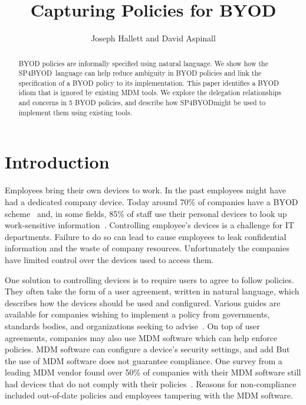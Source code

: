 \documentclass{llncs}
\title{Capturing Policies for BYOD}
\author{Joseph Hallett and David Aspinall}
\institute{School of Informatics, University of Edinburgh}
\newcommand{\AppPAL}[0]{SP4BYOD}
\begin{document}
\maketitle
\begin{abstract}
  BYOD policies are informally specified using natural language.
  We show how the \AppPAL~language can help reduce ambiguity in BYOD policies and link the specification of a BYOD policy to its implementation.
  This paper identifies a BYOD idiom that is ignored by existing MDM tools.
  We explore the delegation relationships and concerns in 5 BYOD policies, and describe how \AppPAL might be used to implement them using existing tools.
\end{abstract}
\section{Introduction}
\label{sec:intro}

Employees bring their own devices to work.
In the past employees might have had a dedicated company device.
Today around 70\% of companies have a BYOD scheme~\cite{schulze_byod_2016} and, in some fields,
  85\% of staff use their personal devices to look up work-sensitive information~\cite{patel_uk_2015}.
Controlling employee's devices is a challenge for IT departments.
Failure to do so can lead to cause employees to leak confidential information and the waste of company resources.
Unfortunately the companies have limited control over the devices used to access them.

One solution to controlling devices is to require users to agree to follow policies.
They often take the form of a user agreement, written in natural language, which describes how the devices should be used and configured.
Various guides are available for companies wishing to implement a policy from governments, standards bodies, and organizations seeking to advise~\cite{nicholas_r._c._guerin_security_2008,souppaya_guidelines_????,hp_byod_????,cesg_byod_2015}.
On top of user agreements, companies may also use \ac{MDM} software which can help enforce policies.
\ac{MDM} software can configure a device's security settings, and add 
But the use of \ac{MDM} software does not guarantee compliance.
One survey from a leading MDM vendor found over 50\% of companies with their \ac{MDM} software still had devices that do not comply with their policies~\cite{mobileiron_security_labs_q4_2015}.
Reasons for non-compliance included out-of-date policies and employees tampering with the \ac{MDM} software.
\end{document}
